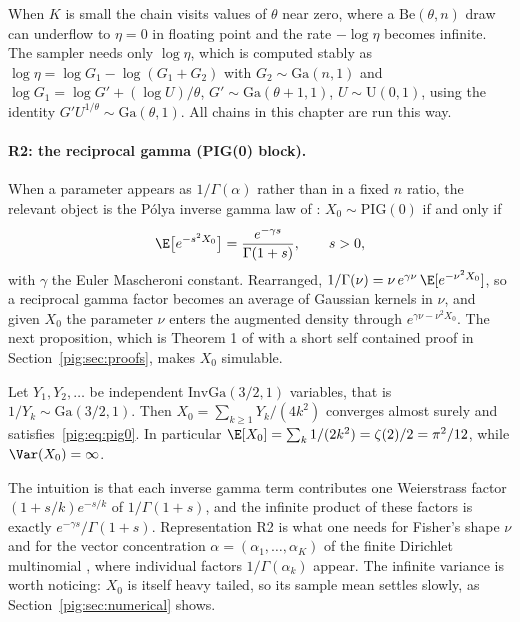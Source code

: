 \begin{remark}\label{pig:rem:smallbeta}
When $K$ is small the chain visits values of $\theta$ near zero, where a $\mathrm{Be}(\theta,n)$ draw can underflow to $\eta=0$ in floating point and the rate $-\log\eta$ becomes infinite. The sampler needs only $\log\eta$, which is computed stably as $\log\eta=\log G_1-\log(G_1+G_2)$ with $G_2\sim\mathrm{Ga}(n,1)$ and $\log G_1=\log G'+(\log U)/\theta$, $G'\sim\mathrm{Ga}(\theta+1,1)$, $U\sim\mathrm{U}(0,1)$, using the identity $G'U^{1/\theta}\sim\mathrm{Ga}(\theta,1)$. All chains in this chapter are run this way.
\end{remark}

\paragraph{R2: the reciprocal gamma (PIG(0) block).} When a parameter appears as $1/\Gamma(\alpha)$ rather than in a fixed $n$ ratio, the relevant object is the P\'olya inverse gamma law of \citet[Definition 2.1]{pig:he2022}: $X_0\sim\mathrm{PIG}(0)$ if and only if
\begin{equation}\label{pig:eq:pig0}
\E\bigl[e^{-s^2X_0}\bigr]=\frac{e^{-\gamma s}}{\Gamma(1+s)},\qquad s>0,
\end{equation}
with $\gamma$ the Euler Mascheroni constant. Rearranged, $1/\Gamma(\nu)=\nu\,e^{\gamma\nu}\,\E[e^{-\nu^2X_0}]$, so a reciprocal gamma factor becomes an average of Gaussian kernels in $\nu$, and given $X_0$ the parameter $\nu$ enters the augmented density through $e^{\gamma\nu-\nu^2X_0}$. The next proposition, which is Theorem 1 of \citet{pig:he2022} with a short self contained proof in Section~\ref{pig:sec:proofs}, makes $X_0$ simulable.

\begin{proposition}\label{pig:prop:pig0}
Let $Y_1,Y_2,\dots$ be independent $\mathrm{InvGa}(3/2,1)$ variables, that is $1/Y_k\sim\mathrm{Ga}(3/2,1)$. Then $X_0=\sum_{k\ge1}Y_k/(4k^2)$ converges almost surely and satisfies~\eqref{pig:eq:pig0}. In particular $\E[X_0]=\sum_k 1/(2k^2)=\zeta(2)/2=\pi^2/12$, while $\Var(X_0)=\infty$.
\end{proposition}

The intuition is that each inverse gamma term contributes one Weierstrass factor $(1+s/k)e^{-s/k}$ of $1/\Gamma(1+s)$, and the infinite product of these factors is exactly $e^{-\gamma s}/\Gamma(1+s)$. Representation R2 is what one needs for Fisher's shape $\nu$ and for the vector concentration $\alpha=(\alpha_1,\dots,\alpha_K)$ of the finite Dirichlet multinomial \citep[Section 4.3]{pig:he2022}, where individual factors $1/\Gamma(\alpha_k)$ appear. The infinite variance is worth noticing: $X_0$ is itself heavy tailed, so its sample mean settles slowly, as Section~\ref{pig:sec:numerical} shows.

